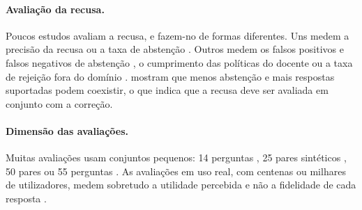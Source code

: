 \paragraph{Avaliação da recusa.} Poucos estudos avaliam a recusa, e fazem-no de formas diferentes. Uns medem a precisão da recusa \parencite{abrar2025domain} ou a taxa de abstenção \parencite{ishadya2026mitigating}. Outros medem os falsos positivos e falsos negativos de abstenção \parencite{hamidi2026large}, o cumprimento das políticas do docente \parencite{rayhan2026sage} ou a taxa de rejeição fora do domínio \parencite{li2026responsible}. \textcite{ishadya2026mitigating} mostram que menos abstenção e mais respostas suportadas podem coexistir, o que indica que a recusa deve ser avaliada em conjunto com a correção.

\paragraph{Dimensão das avaliações.} Muitas avaliações usam conjuntos pequenos: 14 perguntas \parencite{sayeed2026tutor}, 25 pares sintéticos \parencite{bellard2025development}, 50 pares \parencite{feng2024courseassist} ou 55 perguntas \parencite{buti2026evaluating}. As avaliações em uso real, com centenas ou milhares de utilizadores, medem sobretudo a utilidade percebida e não a fidelidade de cada resposta \parencite{seshadri2026alan,emekci2025securing}.

